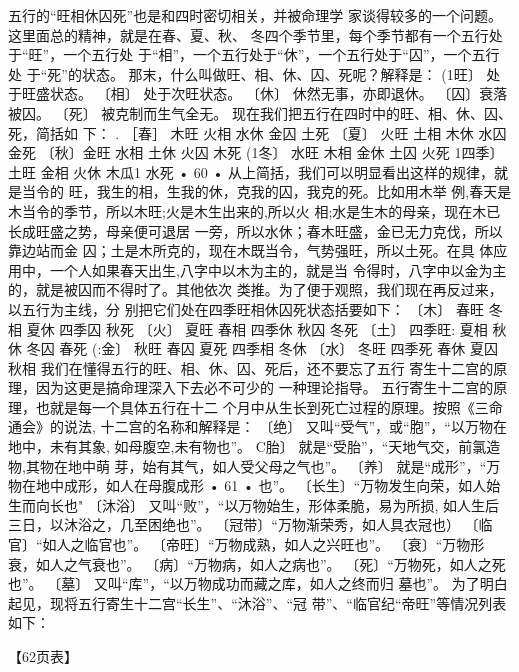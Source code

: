 五行的“旺相休囚死”也是和四时密切相关，并被命理学
家谈得较多的一个问题。这里面总的精神，就是在春、夏、秋、
冬四个季节里，每个季节都有一个五行处于“旺”，一个五行处
于“相”，一个五行处于“休”，一个五行处于“囚”，一个五行处
于“死”的状态。
那末，什么叫做旺、相、休、囚、死呢？解释是：
(1旺〕 处于旺盛状态。
〔相〕 处于次旺状态。
〔休〕 休然无事，亦即退休。
〔囚〕衰落被囚。
〔死〕 被克制而生气全无。
现在我们把五行在四时中的旺、相、休、囚、死，简括如
下： .
［春］ 木旺 火相 水休 金囚 土死
〔夏〕 火旺 土相 木休 水囚 金死
〔秋〕金旺 水相 土休 火囚 木死
(1冬〕 水旺 木相 金休 土囚 火死
1四季〕 土旺 金相 火休 木瓜1 水死
• 60 •
从上简括，我们可以明显看出这样的规律，就是当令的
旺，我生的相，生我的休，克我的囚，我克的死。比如用木举
例,春天是木当令的季节，所以木旺;火是木生出来的,所以火
相;水是生木的母亲，现在木已长成旺盛之势，母亲便可退居
一旁，所以水休；春木旺盛，金已无力克伐，所以靠边站而金
囚；土是木所克的，现在木既当令，气势强旺，所以土死。在具
体应用中，一个人如果春天出生,八字中以木为主的，就是当
令得时，八字中以金为主的，就是被囚而不得时了。其他依次
类推。为了便于观照，我们现在再反过来，以五行为主线，分
别把它们处在四季旺相休囚死状态括要如下：
〔木〕 春旺 冬相 夏休 四季囚 秋死
〔火〕 夏旺 春相 四季休 秋囚 冬死
〔土〕 四季旺: 夏相 秋休 冬囚 春死
(:金〕 秋旺 春囚 夏死 四季相 冬休
〔水〕 冬旺 四季死 春休 夏囚 秋相
我们在懂得五行的旺、相、休、囚、死后，还不要忘了五行
寄生十二宫的原理，因为这更是搞命理深入下去必不可少的
一种理论指导。
五行寄生十二宫的原理，也就是每一个具体五行在十二
个月中从生长到死亡过程的原理。按照《三命通会》的说法,
十二宫的名称和解释是：
〔绝〕 又叫“受气”，或“胞”，“以万物在地中，未有其象,
如母腹空,未有物也”。
C胎〕 就是“受胎”，“天地气交，前氯造物,其物在地中萌
芽，始有其气，如人受父母之气也”。
〔养〕 就是“成形”，“万物在地中成形，如人在母腹成形
• 61 •
也”。
〔长生〕“万物发生向荣，如人始生而向长也"
〔沐浴〕 又叫“败”，“以万物始生，形体柔脆，易为所损,
如人生后三日，以沐浴之，几至困绝也”。
〔冠带〕“万物渐荣秀，如人具衣冠也）
〔临官〕“如人之临官也”。
〔帝旺〕“万物成熟，如人之兴旺也”。
〔衰〕“万物形衰，如人之气衰也”。
〔病〕“万物病，如人之病也”。
〔死〕“万物死，如人之死也”。
〔墓〕 又叫“库”，“以万物成功而藏之库，如人之终而归
墓也”。
为了明白起见，现将五行寄生十二宫“长生”、“沐浴”、“冠
带”、“临官纪“帝旺”等情况列表如下：

【62页表】


